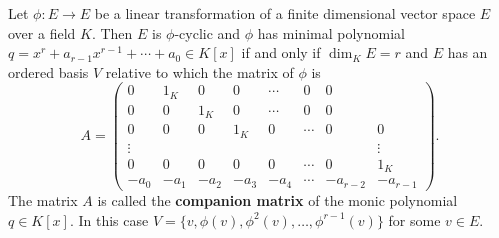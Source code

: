 Let $\phi : E \to E$ be a linear transformation of a finite dimensional vector space $E$ over a field $K$. Then $E$ is $\phi$-cyclic and $\phi$ has minimal polynomial $q = x^r + a_{r-1}x^{r-1} + \cdots + a_0 \in K[x]$ if and only if $\dim_K E = r$ and $E$ has an ordered basis $V$ relative to which the matrix of $\phi$ is
\[
A = \begin{pmatrix}
0 & 1_K & 0 & 0 & \cdots & 0 & 0 \\
0 & 0 & 1_K & 0 & \cdots & 0 & 0 \\
0 & 0 & 0 & 1_K & 0 & \cdots & 0 & 0 \\
\vdots & & & & & & & \vdots \\
0 & 0 & 0 & 0 & 0 & \cdots & 0 & 1_K \\
-a_0 & -a_1 & -a_2 & -a_3 & -a_4 & \cdots & -a_{r-2} & -a_{r-1}
\end{pmatrix}.
\]
The matrix $A$ is called the \textbf{companion matrix} of the monic polynomial $q \in K[x]$. In this case $V = \{v, \phi(v), \phi^2(v), \ldots, \phi^{r-1}(v)\}$ for some $v \in E$.
